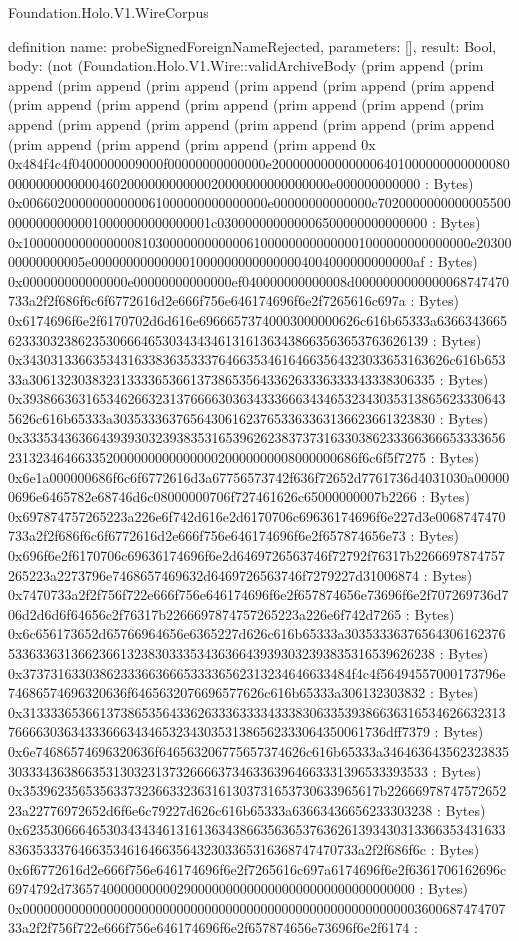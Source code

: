 \begin{lexlean}{Foundation.Holo.V1.WireCorpus}
\begin{semanticmodule}
definition{
  name: probeSignedForeignNameRejected,
  parameters: [],
  result: Bool,
  body: (not (Foundation.Holo.V1.Wire::validArchiveBody (prim append (prim append (prim append (prim append (prim append (prim append (prim append (prim append (prim append (prim append (prim append (prim append (prim append (prim append (prim append (prim append (prim append (prim append (prim append (prim append (prim append (prim append 0x 0x484f4c4f0400000009000f00000000000000e20000000000000064010000000000000800000000000000460200000000000020000000000000000e000000000000 : Bytes) 0x00660200000000000061000000000000000e00000000000000c702000000000000550000000000000010000000000000001c030000000000006500000000000000 : Bytes) 0x1000000000000000810300000000000061000000000000001000000000000000e2030000000000005e0000000000000010000000000000004004000000000000af : Bytes) 0x000000000000000e00000000000000ef040000000000008d0000000000000068747470733a2f2f686f6c6f6772616d2e666f756e646174696f6e2f7265616c697a : Bytes) 0x6174696f6e2f6170702d6d616e69666573740003000000626c616b65333a6366343665623330323862353066646530343434613161363438663563653763626139 : Bytes) 0x3430313366353431633836353337646635346164663564323033653163626c616b65333a3061323038323133336536613738653564336263336333343338306335 : Bytes) 0x3938663631653462663231376666303634333666343465323430353138656233306435626c616b65333a3035333637656430616237653363363136623661323830 : Bytes) 0x33353436366439393032393835316539626238373731633038623336636665333365623132346466335200000000000000020000000008000000686f6c6f5f7275 : Bytes) 0x6e1a000000686f6c6f6772616d3a67756573742f636f72652d7761736d4031030a000000696e6465782e68746d6c08000000706f727461626c65000000007b2266 : Bytes) 0x697874757265223a226e6f742d616e2d6170706c69636174696f6e227d3e0068747470733a2f2f686f6c6f6772616d2e666f756e646174696f6e2f657874656e73 : Bytes) 0x696f6e2f6170706c69636174696f6e2d6469726563746f72792f76317b2266697874757265223a2273796e7468657469632d6469726563746f7279227d31006874 : Bytes) 0x7470733a2f2f756f722e666f756e646174696f6e2f657874656e73696f6e2f707269736d706d2d6d6f64656c2f76317b2266697874757265223a226e6f742d7265 : Bytes) 0x6c656173652d65766964656e6365227d626c616b65333a303533363765643061623765336336313662366132383033353436366439393032393835316539626238 : Bytes) 0x37373163303862333663666533336562313234646633484f4c4f56494557000173796e74686574696320636f6465632076696577626c616b65333a306132303832 : Bytes) 0x313333653661373865356433626333633334333830633539386636316534626632313766663036343336663434653234303531386562333064350061736dff7379 : Bytes) 0x6e74686574696320636f646563206775657374626c616b65333a346463643562323835303334363866353130323137326666373463363964663331396533393533 : Bytes) 0x353962356535633732366332363161303731653730633965617b2266697874757265223a22776972652d6f6e6c79227d626c616b65333a63663436656233303238 : Bytes) 0x62353066646530343434613161363438663563653763626139343031336635343163383635333764663534616466356432303365316368747470733a2f2f686f6c : Bytes) 0x6f6772616d2e666f756e646174696f6e2f7265616c697a6174696f6e2f6361706162696c6974792d73657400000000002900000000000000000000000000000000 : Bytes) 0x00000000000000000000000000000000000000000000000000000000360068747470733a2f2f756f722e666f756e646174696f6e2f657874656e73696f6e2f6174 : }
\end{semanticmodule}
\end{lexlean}
